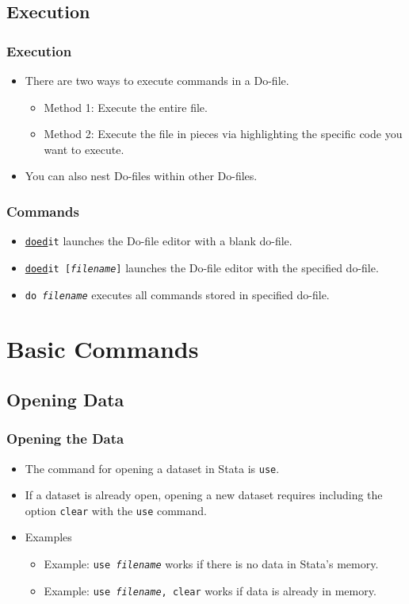 \documentclass{beamer}
\begin{document}
\subsection{Execution}

\begin{frame}
	\frametitle{Execution}
		\begin{itemize}
		\item There are two ways to execute commands in a Do-file.
			\begin{itemize}
				\item Method 1: Execute the entire file.
				\item Method 2: Execute the file in pieces via highlighting the specific code you want to execute.
			\end{itemize}
		\item You can also nest Do-files within other Do-files.
		\end{itemize}
\end{frame}

\begin{frame}
	\frametitle{Commands}
	\begin{itemize}
		\item \texttt{\underline{doed}it} launches the Do-file editor with a blank do-file.
		\item \texttt{\underline{doed}it [\textit{filename}]} launches the Do-file editor with the specified do-file.
		\item \texttt{do \textit{filename}} executes all commands stored in specified do-file. 
	\end{itemize}
\end{frame}

\section{Basic Commands}
\subsection{Opening Data}

\begin{frame}
	\frametitle{Opening the Data}
		\begin{itemize}
			\item The command for opening a dataset in Stata is \texttt{use}.
			\item If a dataset is already open, opening a new dataset requires including the option \texttt{clear} with the \texttt{use} command.
			\item Examples
				\begin{itemize}
					\item Example: \texttt{use \textit{filename}} works if there is no data in Stata's memory.
					\item Example: \texttt{use \textit{filename}, clear} works if data is already in memory.
				\end{itemize}
		\end{itemize}
\end{frame}
\end{document}
